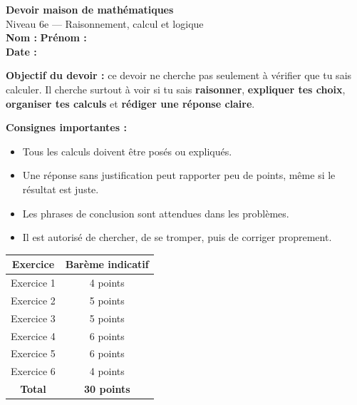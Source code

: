 \documentclass[11pt,a4paper]{article}
\begin{document}
\begin{center}
    {\Large \textbf{\textcolor{bleu}{Devoir maison de mathématiques}}}\\[2mm]
    {\large Niveau 6e — Raisonnement, calcul et logique}\\[2mm]
    \textbf{Nom :} \dotfill \qquad
    \textbf{Prénom :} \dotfill \\[2mm]
    \textbf{Date :} \dotfill
\end{center}

\vspace{3mm}

\begin{consigne}
\textbf{Objectif du devoir :} ce devoir ne cherche pas seulement à vérifier que tu sais calculer.
Il cherche surtout à voir si tu sais \textbf{raisonner}, \textbf{expliquer tes choix}, \textbf{organiser tes calculs}
et \textbf{rédiger une réponse claire}.
\end{consigne}

\vspace{2mm}

\begin{attention}
\textbf{Consignes importantes :}
\begin{itemize}
    \item Tous les calculs doivent être posés ou expliqués.
    \item Une réponse sans justification peut rapporter peu de points, même si le résultat est juste.
    \item Les phrases de conclusion sont attendues dans les problèmes.
    \item Il est autorisé de chercher, de se tromper, puis de corriger proprement.
\end{itemize}
\end{attention}

\vspace{4mm}

\begin{center}
\renewcommand{\arraystretch}{1.3}
\begin{tabular}{|c|c|}
\hline
\textbf{Exercice} & \textbf{Barème indicatif} \\
\hline
Exercice 1 & 4 points \\
Exercice 2 & 5 points \\
Exercice 3 & 5 points \\
Exercice 4 & 6 points \\
Exercice 5 & 6 points \\
Exercice 6 & 4 points \\
\hline
\textbf{Total} & \textbf{30 points} \\
\hline
\end{tabular}
\end{center}
\end{document}
